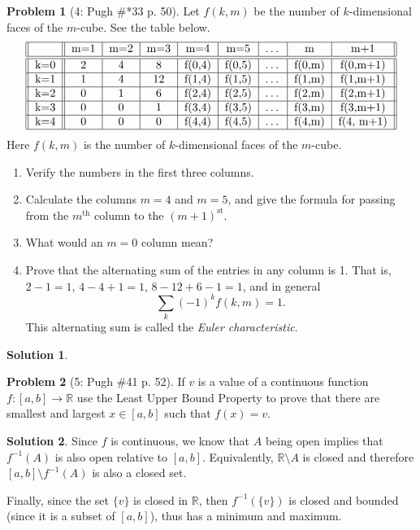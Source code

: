 \documentclass{article}
\theoremstyle{definition}
\newtheorem*{soln}{Solution}
\newtheorem*{prob}{Problem}
\theoremstyle{theorem}
\newcommand{\R}{\mathbb{R}}
\begin{document}
\begin{prob}[4: Pugh \#*33 p. 50]
Let $f(k,m)$ be the number of $k$-dimensional faces of the $m$-cube. See the table below.
\[
\begin{tabular}{||c||c|c|c|c|c|c|c|c||}
\hline
& m=1 & m=2 & m=3 & m=4 & m=5 & \ldots & m & m+1\\
\hline
\hline
k=0 & 2 & 4 & 8 & f(0,4) & f(0,5) & \ldots & f(0,m) & f(0,m+1)\\
\hline
k=1 & 1 & 4 & 12 & f(1,4) & f(1,5) & \ldots & f(1,m) & f(1,m+1)\\
\hline
k=2 & 0 & 1 & 6 & f(2,4) & f(2,5) & \ldots & f(2,m) & f(2,m+1)\\
\hline
k=3 & 0 & 0 & 1 & f(3,4) & f(3,5) & \ldots & f(3,m) & f(3,m+1) \\
\hline
k=4 & 0 & 0 & 0 & f(4,4) & f(4,5) & \ldots & f(4,m) & f(4, m+1)\\
\hline
\end{tabular}\]
Here $f(k,m)$ is the number of $k$-dimensional faces of the $m$-cube.
\begin{enumerate}
    \item Verify the numbers in the first three columns.
    \item Calculate the columns $m=4$ and $m=5$, and give the formula for passing from the $m^\text{th}$ column to the $(m+1)^{\text{st}}$.
    \item What would an $m=0$ column mean?
    \item Prove that the alternating sum of the entries in any column is 1. That is, $2-1=1$, $4-4+1=1$, $8-12+6-1=1$, and in general $$\sum_k (-1)^k f(k,m) = 1.$$ This alternating sum is called the \emph{Euler characteristic}.
\end{enumerate}
\end{prob}
\begin{soln}

\end{soln}
\vspace{1in}


\begin{prob}[5: Pugh \#41 p. 52]
If $v$ is a value of a continuous function $f: [a,b] \to \R$ use the Least Upper Bound Property to prove that there are smallest and largest $x \in [a,b]$ such that $f(x) = v$.
\end{prob}
\begin{soln}
    Since $f$ is continuous, we know that $A$ being open  implies  that $f^{-1}(A)$ is also open relative to $[a,b]$. Equivalently, $\R\setminus A$ is closed and therefore $[a,b] \setminus f^{-1}( A)$ is also a closed set. 

    Finally, since the set $\{v\}$ is closed in $\R$, then $f^{-1}(\{v\}) $ is closed and bounded (since it is a subset of $[a,b]$), thus has a minimum and maximum.


\end{soln}
\vspace{1in}
\end{document}
